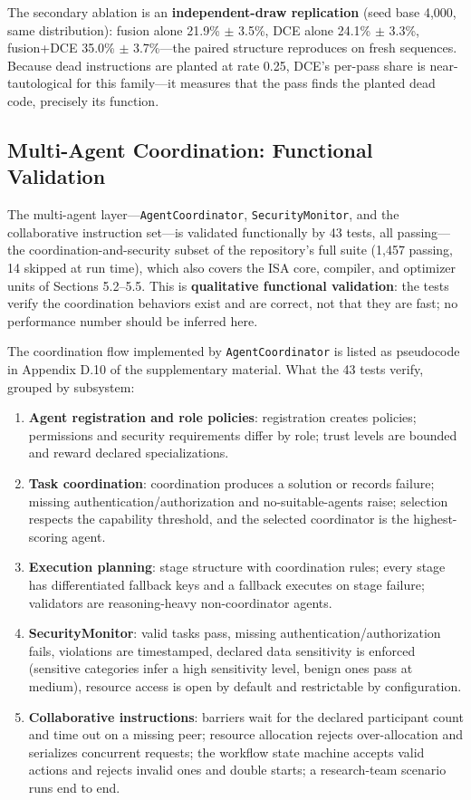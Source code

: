 \documentclass[
  sigconf,
  anonymous]{acmart}
\providecommand{\tightlist}{%
  \setlength{\itemsep}{0pt}\setlength{\parskip}{0pt}}
\begin{document}
The secondary ablation is an \textbf{independent-draw replication} (seed
base 4,000, same distribution): fusion alone 21.9\% \(\pm\) 3.5\%, DCE
alone 24.1\% \(\pm\) 3.3\%, fusion+DCE 35.0\% \(\pm\) 3.7\%---the paired
structure reproduces on fresh sequences. Because dead instructions are
planted at rate 0.25, DCE's per-pass share is near-tautological for this
family---it measures that the pass finds the planted dead code,
precisely its function.

\subsection{Multi-Agent Coordination: Functional
Validation}\label{multi-agent-coordination-functional-validation}

The multi-agent layer---\texttt{AgentCoordinator},
\texttt{SecurityMonitor}, and the collaborative instruction set---is
validated functionally by 43 tests, all passing---the
coordination-and-security subset of the repository's full suite (1,457
passing, 14 skipped at run time), which also covers the ISA core,
compiler, and optimizer units of Sections 5.2--5.5. This is
\textbf{qualitative functional validation}: the tests verify the
coordination behaviors exist and are correct, not that they are fast; no
performance number should be inferred here.

The coordination flow implemented by \texttt{AgentCoordinator} is listed
as pseudocode in Appendix D.10 of the supplementary material. What the
43 tests verify, grouped by subsystem:

\begin{enumerate}
\def\labelenumi{\arabic{enumi}.}
\tightlist
\item
  \textbf{Agent registration and role policies}: registration creates
  policies; permissions and security requirements differ by role; trust
  levels are bounded and reward declared specializations.
\item
  \textbf{Task coordination}: coordination produces a solution or
  records failure; missing authentication/authorization and
  no-suitable-agents raise; selection respects the capability threshold,
  and the selected coordinator is the highest-scoring agent.
\item
  \textbf{Execution planning}: stage structure with coordination rules;
  every stage has differentiated fallback keys and a fallback executes
  on stage failure; validators are reasoning-heavy non-coordinator
  agents.
\item
  \textbf{SecurityMonitor}: valid tasks pass, missing
  authentication/authorization fails, violations are timestamped,
  declared data sensitivity is enforced (sensitive categories infer a
  high sensitivity level, benign ones pass at medium), resource access
  is open by default and restrictable by configuration.
\item
  \textbf{Collaborative instructions}: barriers wait for the declared
  participant count and time out on a missing peer; resource allocation
  rejects over-allocation and serializes concurrent requests; the
  workflow state machine accepts valid actions and rejects invalid ones
  and double starts; a research-team scenario runs end to end.
\end{enumerate}
\end{document}
